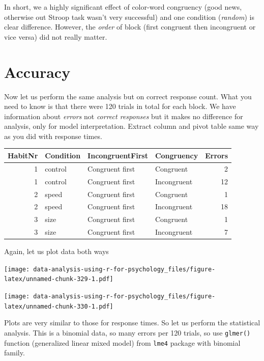 \documentclass[
]{book}
\begin{document}
In short, we a highly significant effect of color-word congruency (good news, otherwise out Stroop task wasn't very successful) and one condition (\emph{random}) is clear difference. However, the \emph{order} of block (first congruent then incongruent or vice versa) did not really matter.

\hypertarget{accuracy-1}{%
\section{Accuracy}\label{accuracy-1}}

Now let us perform the same analysis but on correct response count. What you need to know is that there were 120 trials in total for each block. We have information about \emph{errors} not \emph{correct responses} but it makes no difference for analysis, only for model interpretation. Extract column and pivot table same way as you did with response times.

\begin{tabular}{r|l|l|l|r}
\hline
HabitNr & Condition & IncongruentFirst & Congruency & Errors\\
\hline
1 & control & Congruent first & Congruent & 2\\
\hline
1 & control & Congruent first & Incongruent & 12\\
\hline
2 & speed & Congruent first & Congruent & 1\\
\hline
2 & speed & Congruent first & Incongruent & 18\\
\hline
3 & size & Congruent first & Congruent & 1\\
\hline
3 & size & Congruent first & Incongruent & 7\\
\hline
\end{tabular}

Again, let us plot data both ways

\texttt{[image: data-analysis-using-r-for-psychology\_files/figure-latex/unnamed-chunk-329-1.pdf]}

\texttt{[image: data-analysis-using-r-for-psychology\_files/figure-latex/unnamed-chunk-330-1.pdf]}

Plots are very similar to those for response times. So let us perform the statistical analysis. This is a binomial data, so many errors per 120 trials, so use \texttt{glmer()} function (generalized linear mixed model) from \texttt{lme4} package with binomial family.
\end{document}
